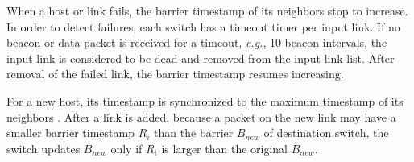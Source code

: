 When a host or link fails, the barrier timestamp of its neighbors stop to increase. 
In order to detect failures, each switch has a timeout timer per input link. If no beacon or data packet is received for a timeout, \textit{e.g.}, 10 beacon intervals, the input link is considered to be dead and removed from the input link list.
After removal of the failed link, the barrier timestamp resumes increasing.

For a new host, its timestamp is synchronized to the maximum timestamp of its neighbors . After a link is added, because a packet on the new link may have a smaller barrier timestamp $R_i$ than the barrier $B_{new}$ of destination switch, the switch updates $B_{new}$ only if $R_i$ is larger than the original $B_{new}$.~







